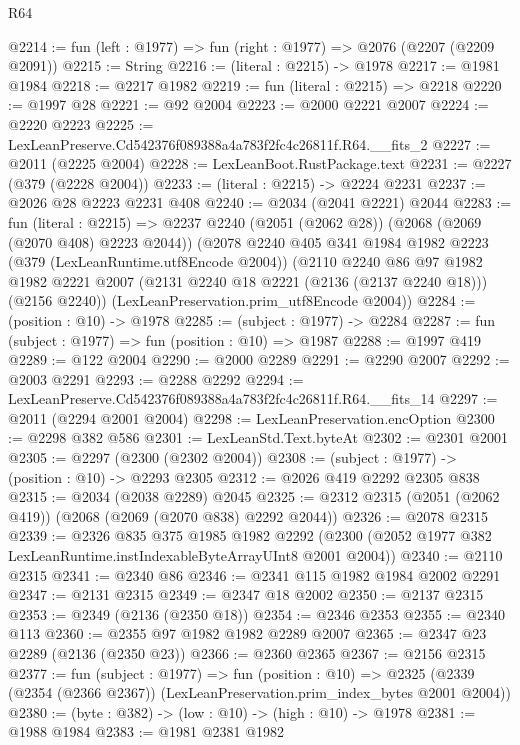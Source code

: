\begin{lexlean}{R64}
\begin{coremodule}
@2214 := fun (left : @1977) => fun (right : @1977) => @2076 (@2207 (@2209 @2091))
@2215 := String
@2216 := (literal : @2215) -> @1978
@2217 := @1981 @1984
@2218 := @2217 @1982
@2219 := fun (literal : @2215) => @2218
@2220 := @1997 @28
@2221 := @92 @2004
@2223 := @2000 @2221 @2007
@2224 := @2220 @2223
@2225 := LexLeanPreserve.Cd542376f089388a4a783f2fc4c26811f.R64.__fits_2
@2227 := @2011 (@2225 @2004)
@2228 := LexLeanBoot.RustPackage.text
@2231 := @2227 (@379 (@2228 @2004))
@2233 := (literal : @2215) -> @2224 @2231
@2237 := @2026 @28 @2223 @2231 @408
@2240 := @2034 (@2041 @2221) @2044
@2283 := fun (literal : @2215) =>
  @2237
    @2240
    (@2051 (@2062 @28))
    (@2068 (@2069 (@2070 @408) @2223 @2044))
    (@2078
      @2240
      @405
      @341
      @1984
      @1982
      @2223
      (@379 (LexLeanRuntime.utf8Encode @2004))
      (@2110
        @2240
        @86
        @97
        @1982
        @1982
        @2221
        @2007
        (@2131 @2240 @18 @2221 (@2136 (@2137 @2240 @18)))
        (@2156 @2240))
      (LexLeanPreservation.prim_utf8Encode @2004))
@2284 := (position : @10) -> @1978
@2285 := (subject : @1977) -> @2284
@2287 := fun (subject : @1977) => fun (position : @10) => @1987
@2288 := @1997 @419
@2289 := @122 @2004
@2290 := @2000 @2289
@2291 := @2290 @2007
@2292 := @2003 @2291
@2293 := @2288 @2292
@2294 := LexLeanPreserve.Cd542376f089388a4a783f2fc4c26811f.R64.__fits_14
@2297 := @2011 (@2294 @2001 @2004)
@2298 := LexLeanPreservation.encOption
@2300 := @2298 @382 @586
@2301 := LexLeanStd.Text.byteAt
@2302 := @2301 @2001
@2305 := @2297 (@2300 (@2302 @2004))
@2308 := (subject : @1977) -> (position : @10) -> @2293 @2305
@2312 := @2026 @419 @2292 @2305 @838
@2315 := @2034 (@2038 @2289) @2045
@2325 := @2312 @2315 (@2051 (@2062 @419)) (@2068 (@2069 (@2070 @838) @2292 @2044))
@2326 := @2078 @2315
@2339 := @2326
    @835
    @375
    @1985
    @1982
    @2292
    (@2300 (@2052 @1977 @382 LexLeanRuntime.instIndexableByteArrayUInt8 @2001 @2004))
@2340 := @2110 @2315
@2341 := @2340 @86
@2346 := @2341 @115 @1982 @1984 @2002 @2291
@2347 := @2131 @2315
@2349 := @2347 @18 @2002
@2350 := @2137 @2315
@2353 := @2349 (@2136 (@2350 @18))
@2354 := @2346 @2353
@2355 := @2340 @113
@2360 := @2355 @97 @1982 @1982 @2289 @2007
@2365 := @2347 @23 @2289 (@2136 (@2350 @23))
@2366 := @2360 @2365
@2367 := @2156 @2315
@2377 := fun (subject : @1977) =>
  fun (position : @10) =>
  @2325 (@2339 (@2354 (@2366 @2367)) (LexLeanPreservation.prim_index_bytes @2001 @2004))
@2380 := (byte : @382) -> (low : @10) -> (high : @10) -> @1978
@2381 := @1988 @1984
@2383 := @1981 @2381 @1982

\end{coremodule}
\end{lexlean}
